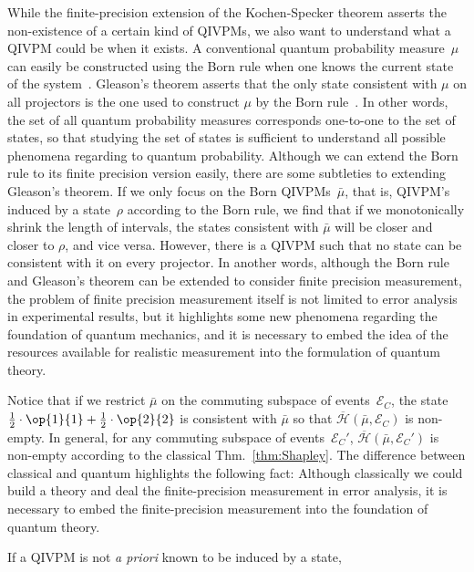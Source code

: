 \documentclass[english,reprint, aps, prl,superscriptaddress, showpacs,
showkeys, longbibliography, amsmath, amssymb, floatfix]{revtex4-1}
\theoremstyle{plain}
\theoremstyle{definition}
\newcommand{\Hilb}{\mathcal{H}}
\newcommand{\events}{\ensuremath{\mathcal{E}}}
\newcommand{\proj}[1]{\op{#1}{#1}}
\newcommand{\coreBorn}{\ensuremath{\overline{\Hilb}}}
\begin{document}
While the finite-precision extension of the Kochen-Specker theorem
asserts the non-existence of a certain kind of QIVPMs, we also want
to understand what a QIVPM could be when it exists. A conventional
quantum probability measure~$\mu$ can easily be constructed using
the Born rule when one knows the current state of the system~\citep{Born1983,peres1995quantum,544199,Jaeger2007}.
Gleason's theorem asserts that the only state consistent with $\mu$
on all projectors is the one used to construct $\mu$ by the Born
rule~\citep{gleason1957,Redhead1987-REDINA,peres1995quantum}. In
other words, the set of all quantum probability measures corresponds
one-to-one to the set of states, so that studying the set of states
is sufficient to understand all possible phenomena regarding to quantum
probability. Although we can extend the Born rule to its finite precision
version easily, there are some subtleties to extending Gleason's theorem.
If we only focus on the Born QIVPMs~$\bar{\mu}$, that is, QIVPM's
induced by a state~$\rho$ according to the Born rule, we find that
if we monotonically shrink the length of intervals, the states consistent
with $\bar{\mu}$ will be closer and closer to $\rho$, and vice versa.
However, there is a QIVPM such that no state can be consistent with
it on every projector. In another words, although the Born rule and
Gleason's theorem can be extended to consider finite precision measurement,
the problem of finite precision measurement itself is not limited
to error analysis in experimental results, but it highlights some
new phenomena regarding the foundation of quantum mechanics, and it
is necessary to embed the idea of the resources available for realistic
measurement into the formulation of quantum theory.

Notice that if we restrict $\bar{\mu}$ on the commuting subspace
of events~$\events_{C}$, the state~$\frac{1}{2}\cdot\proj{1}+\frac{1}{2}\cdot\proj{2}$
is consistent with $\bar{\mu}$ so that $\coreBorn\left(\bar{\mu},\events_{C}\right)$
is non-empty. In general, for any commuting subspace of events~$\events_{C}'$,
$\coreBorn\left(\bar{\mu},\events_{C}'\right)$ is non-empty according
to the classical Thm.~\ref{thm:Shapley}. The difference between
classical and quantum highlights the following fact: Although classically
we could build a theory and deal the finite-precision measurement
in error analysis, it is necessary to embed the finite-precision measurement
into the foundation of quantum theory.

If a QIVPM is not \emph{a priori} known to be induced by a state, 
\end{document}
